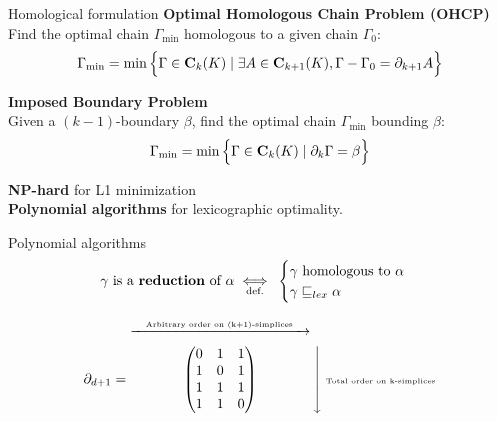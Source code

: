 \begin{frame}[t]{Homological formulation}
\small
\textbf{Optimal Homologous Chain Problem (OHCP)} \\
Find the optimal chain $\Gamma_{\min}$ homologous to a given chain $\Gamma_0$:
\begin{equation*}
	\Gamma_{\min} = \min \Big\{ \Gamma \in \mathbf{C}_k(K) \mid \exists A \in \mathbf{C}_{k+1}(K), \Gamma - \Gamma_0 = \partial_{k+1} A \Big\}
\end{equation*}

\vspace{0.5cm}

\textbf{Imposed Boundary Problem} \\
Given a $(k-1)$-boundary $\beta$, find the optimal chain $\Gamma_{\min}$ bounding $\beta$:
\begin{equation*}
	\Gamma_{\min} = \min \Big\{ \Gamma \in \mathbf{C}_k(K) \mid \partial_k \Gamma = \beta \Big\}
\end{equation*}

\pause
\vspace{0.5cm}
\textbf{NP-hard} for L1 minimization \cite{dey_ComputingMinimalPersistent_2020} \\
\pause
\textbf{Polynomial algorithms} for lexicographic optimality.
\end{frame}

\begin{frame}{Polynomial algorithms}
	\small	
	\[
		\gamma \textrm{ is a \textbf{reduction} of }\alpha \underset{\text{def.}}{\iff} \:
		\begin{cases} 
			\gamma \textrm{ homologous to } \alpha\\
			\gamma \sqsubseteq_{lex} \alpha
		\end{cases}
	\]

	\[
		\partial_{d+1} = \arrowbounded{\begin{pmatrix}
				0 & 1 & 1 \\
				1 & 0 & 1 \\
				1 & 1 & 1 \\
				1 & 1 & 0 \\
		\end{pmatrix}
		}{Arbitrary order on (k+1)-simplices} \text{\tiny Total order on k-simplices}
	\]
\end{frame}

